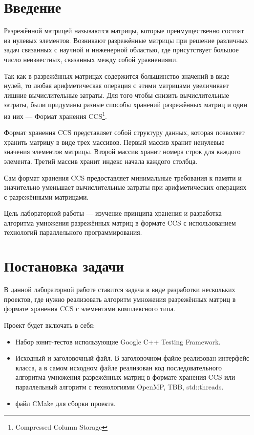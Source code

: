\documentclass[14pt,a4paper,report]{ncc}
\begin{document}
	\section*{Введение}
	
	Разрежённой матрицей называются матрицы, которые преимущественно состоят из нулевых элементов. Возникают разрежённые матрицы при решение различных задач связанных с научной и инженерной областью, где присутствует большое число неизвестных, связанных между собой уравнениями.
	\par Так как в разрежённых матрицах содержится большинство значений в виде нулей, то любая арифметическая операция с этими матрицами увеличивает лишние вычислительные затраты. Для того чтобы снизить вычислительные затраты, были придуманы разные способы хранений разрежённых матриц и один из них --- Формат хранения CCS\footnote{Compressed Column Storage}. 
	\par Формат хранения CCS представляет собой структуру данных, которая позволяет хранить матрицу в виде трех массивов. Первый массив хранит ненулевые значения элементов матрицы. Второй массив хранит номера строк для каждого элемента. Третий массив хранит индекс начала каждого столбца.
	\par Сам формат хранения CCS предоставляет минимальные требования к памяти и значительно уменьшает вычислительные затраты при арифметических операциях с разрежёнными матрицами.
	\par Цель лабораторной работы --- изучение принципа хранения и разработка алгоритма умножения разрежённых матриц в формате CCS с использованием технологий параллельного программирования.
	\newpage
	
	\section*{Постановка задачи}
	В данной лабораторной работе ставится задача в виде разработки нескольких проектов, где нужно реализовать алгоритм умножения разрежённых матриц в формате хранения CCS с элементами комплексного типа.
	\par Проект будет включать в себя:
	\begin{itemize}
		\item Набор юнит-тестов использующие Google C++ Testing Framework.
		\item Исходный и заголовочный файл. В заголовочном файле реализован интерфейс класса, а в самом исходном файле реализован код последовательного алгоритма умножения разрежённых матриц в формате хранения CCS или параллельный алгоритм с технологиями OpenMP, TBB, std::threads.
		\item файл CMake для сборки проекта.
	\end{itemize}
	\newpage
	
\end{document}
